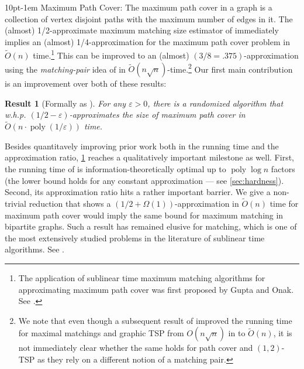 \documentclass[letterpaper,11pt]{article}
\makeatletter
\renewcommand{\epsilon}{\varepsilon}
\DeclareMathOperator{\poly}{poly}
\newtheorem{result}{Result}
\newenvironment{graytbox}{
\par\addvspace{0.1cm}
\begin{tcolorbox}[width=\textwidth,
                  boxsep=5pt,
                  left=1pt,
                  right=1pt,
                  top=2pt,
                  bottom=2pt,
                  boxrule=0pt,
                  arc=0pt,
                  colback=mylightgray,
                  colframe=black,
                  ]%
}{
\end{tcolorbox}
}
\renewcommand{\paragraph}{%
  \@startsection{paragraph}{4}%
  {\z@}{10pt}{-1em}%
  {\normalfont\normalsize\bfseries}%
}
\makeatother
\begin{document}
\vspace{-0.2cm}
\paragraph{Maximum Path Cover:}  The maximum path cover in a graph is a collection of vertex disjoint paths with the maximum number of edges in it. The (almost) 1/2-approximate maximum matching size estimator of \citet*{behnezhad2021} immediately implies an (almost) 1/4-approximation for the maximum path cover problem in $\widetilde{O}(n)$ time.\footnote{The application of sublinear time maximum matching algorithms for approximating maximum path cover was first proposed by Gupta and Onak. See \cite{sublinear-info}.} This can be improved to an (almost) $(3/8 = .375)$-approximation using the {\em matching-pair} idea of \citet*{chen2020} in $\widetilde{O}(n \sqrt{n})$-time.\footnote{We note that even though a subsequent result of \citet*{behnezhad2021} improved the running time for maximal matchings and graphic TSP from $O(n\sqrt{n})$ in \cite{chen2020} to $\widetilde{O}(n)$, it is not immediately clear whether the same holds for path cover and $(1,2)$-TSP as they rely on a different notion of a matching pair.} Our first main contribution is an improvement over both of these results:

\begin{graytbox}
\begin{result}[Formally as ]\label{res:path-cover}
    For any $\epsilon > 0$, there is a randomized algorithm that w.h.p. $(1/2-\epsilon)$-approximates the size of maximum path cover in $\widetilde{O}(n \cdot \poly(1/\epsilon))$ time.
\end{result}
\end{graytbox}

Besides quantitavely improving prior work both in the running time and the approximation ratio, \cref{res:path-cover} reaches a qualitatively important milestone as well. First, the running time of  is information-theoretically optimal up to $\poly\log n$ factors (the lower bound holds for any constant approximation --- see \cref{sec:hardness}). Second, its approximation ratio hits a rather important barrier. We give a non-trivial reduction that shows a $(1/2+\Omega(1))$-approximation in $\widetilde{O}(n)$ time for maximum path cover would imply the same bound for maximum matching in bipartite graphs. Such a result has remained elusive for matching, which is one of the most extensively studied problems in the literature of sublinear time algorithms. See .
\end{document}
